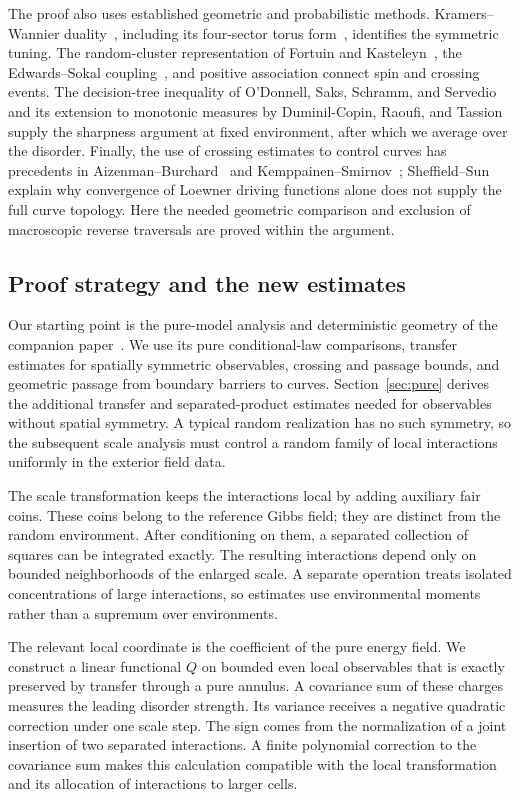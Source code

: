 The proof also uses established geometric and probabilistic methods.
Kramers--Wannier duality~\cite{KW}, including its four-sector torus
form~\cite[Equations~(4)--(5)]{BS}, identifies the symmetric tuning.
The random-cluster representation of Fortuin and Kasteleyn~\cite{FK},
the Edwards--Sokal coupling~\cite{ES}, and positive association
\cite{FKG} connect spin and crossing events. The decision-tree
inequality of O'Donnell, Saks, Schramm, and Servedio~\cite{OSSS} and
its extension to monotonic measures by Duminil-Copin, Raoufi, and
Tassion~\cite[Theorem~1.1]{DCRT} supply the sharpness argument at fixed environment, after which we average
over the disorder. Finally, the use of crossing estimates to
control curves has precedents in Aizenman--Burchard~\cite{AB} and
Kemppainen--Smirnov~\cite{KS}; Sheffield--Sun~\cite{SS} explain why
convergence of Loewner driving functions alone does not supply the full
curve topology. Here the needed geometric comparison and exclusion of
macroscopic reverse traversals are proved within the argument.


\subsection{Proof strategy and the new estimates}

Our starting point is the pure-model analysis and deterministic geometry
of the companion paper~\cite{S}. We use its pure conditional-law
comparisons, transfer estimates for spatially symmetric observables,
crossing and passage bounds, and geometric passage from boundary barriers
to curves. Section~\ref{sec:pure} derives the additional transfer and
separated-product estimates needed for observables without spatial
symmetry. A typical random realization has no such symmetry, so the
subsequent scale analysis must control a random family of local
interactions uniformly in the exterior field data.

The scale transformation keeps the interactions local by adding
auxiliary fair coins. These coins belong to the reference Gibbs field;
they are distinct from the random environment. After conditioning on
them, a separated collection of squares can be integrated exactly.
The resulting interactions depend only on bounded neighborhoods of
the enlarged scale. A separate operation treats isolated concentrations
of large interactions, so estimates use environmental moments rather
than a supremum over environments.

The relevant local coordinate is the coefficient of the pure energy
field. We construct a linear functional $Q$ on bounded even local
observables that is exactly preserved by transfer through a pure
annulus. A covariance sum of these charges measures the leading
disorder strength. Its variance receives a negative quadratic correction
under one scale step. The sign comes from the normalization of a joint
insertion of two separated interactions. A finite polynomial correction
to the covariance sum makes this calculation compatible with the local
transformation and its allocation of interactions to larger cells.

